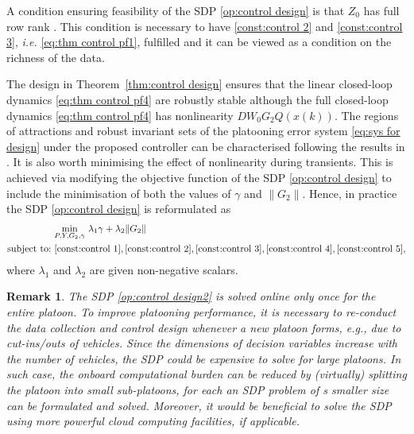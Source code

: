 \documentclass[letterpaper, 10 pt, conference]{ieeeconf}
\newtheorem{remark}{Remark}[section]
\begin{document}
A condition ensuring feasibility of the SDP  
\eqref{op:control design} is that $Z_0$ has full row rank \cite{Persis+23}. 
This condition is necessary to have \eqref{const:control 2} and 
\eqref{const:control 3}, \textit{i.e.} \eqref{eq:thm control pf1}, fulfilled and it can be viewed as a condition on the richness of the data. 

The design in Theorem~\ref{thm:control design} ensures that the linear 
closed-loop dynamics \eqref{eq:thm control pf4} are robustly stable although 
the full closed-loop dynamics \eqref{eq:thm control pf4} has nonlinearity $D 
W_0 G_2 Q(x(k))$. 
The regions of attractions and robust invariant sets of the platooning error system \eqref{eq:sys for design} under the proposed controller can be characterised following the results in \cite[Secton VI]{Persis+23}.
It is also worth minimising the effect of nonlinearity 
during transients. This is achieved via modifying the objective 
function of the SDP \eqref{op:control design} to include the minimisation of both the values of $\gamma$ and $\| G_2 \|$. Hence, in practice the SDP \eqref{op:control design} is reformulated as
\begin{align}\label{op:control design2}	
	& \underset{P, Y, G_2, \gamma}{\min} ~\lambda_1 \gamma + \lambda_2 \|
	G_2 \| \nonumber\\
	\text{subject~to:} ~& 
	\eqref{const:control 1}, \eqref{const:control 2}, \eqref{const:control 3}, 
	\eqref{const:control 4}, \eqref{const:control 5},
\end{align}	
where $\lambda_1$ and $\lambda_2$ are given non-negative scalars. 

\begin{remark}\label{remark:runtime}
The SDP \eqref{op:control design2} is solved online only once for the entire platoon. To improve platooning performance, it is necessary to re-conduct the data collection and control design whenever a new platoon forms, \textit{e.g.}, due to cut-ins/outs of vehicles.	
Since the dimensions of decision variables increase with the number of vehicles, the SDP could be expensive to solve for large platoons. In such case, the onboard computational burden can be reduced by (virtually) splitting the platoon into small sub-platoons, for each an SDP problem of s smaller size can be formulated and solved. Moreover, it would be beneficial to solve the SDP using more powerful cloud computing facilities, if applicable.  

\end{remark}
\end{document}
